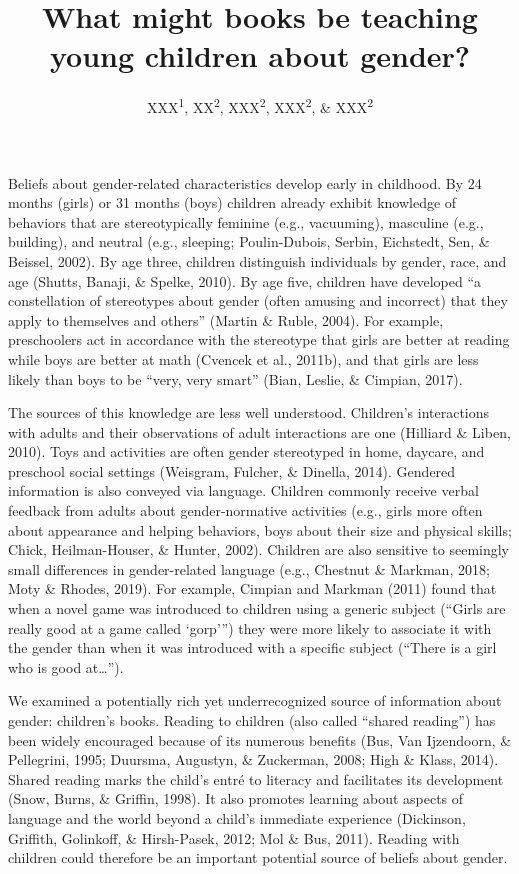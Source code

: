 \documentclass[
  english,
  ,man,floatsintext]{apa6}
\title{What might books be teaching young children about gender?}
\author{XXX\textsuperscript{1}, XX\textsuperscript{2}, XXX\textsuperscript{2}, XXX\textsuperscript{2}, \& XXX\textsuperscript{2}}
\date{}
\affiliation{\vspace{0.5cm}\textsuperscript{1} XXX\\\textsuperscript{2} XXX}
\begin{document}
\maketitle

Beliefs about gender-related characteristics develop early in childhood. By 24 months (girls) or 31 months (boys) children already exhibit knowledge of behaviors that are stereotypically feminine (e.g., vacuuming), masculine (e.g., building), and neutral (e.g., sleeping; Poulin-Dubois, Serbin, Eichstedt, Sen, \& Beissel, 2002). By age three, children distinguish individuals by gender, race, and age (Shutts, Banaji, \& Spelke, 2010). By age five, children have developed \enquote{a constellation of stereotypes about gender (often amusing and incorrect) that they apply to themselves and others} (Martin \& Ruble, 2004). For example, preschoolers act in accordance with the stereotype that girls are better at reading while boys are better at math (Cvencek et al., 2011b), and that girls are less likely than boys to be \enquote{very, very smart} (Bian, Leslie, \& Cimpian, 2017).

The sources of this knowledge are less well understood. Children's interactions with adults and their observations of adult interactions are one (Hilliard \& Liben, 2010). Toys and activities are often gender stereotyped in home, daycare, and preschool social settings (Weisgram, Fulcher, \& Dinella, 2014). Gendered information is also conveyed via language. Children commonly receive verbal feedback from adults about gender-normative activities (e.g., girls more often about appearance and helping behaviors, boys about their size and physical skills; Chick, Heilman-Houser, \& Hunter, 2002). Children are also sensitive to seemingly small differences in gender-related language (e.g., Chestnut \& Markman, 2018; Moty \& Rhodes, 2019). For example, Cimpian and Markman (2011) found that when a novel game was introduced to children using a generic subject (\enquote{Girls are really good at a game called \enquote{gorp}}) they were more likely to associate it with the gender than when it was introduced with a specific subject (\enquote{There is a girl who is good at\ldots{}}).

We examined a potentially rich yet underrecognized source of information about gender: children's books. Reading to children (also called \enquote{shared reading}) has been widely encouraged because of its numerous benefits (Bus, Van Ijzendoorn, \& Pellegrini, 1995; Duursma, Augustyn, \& Zuckerman, 2008; High \& Klass, 2014). Shared reading marks the child's entré to literacy and facilitates its development (Snow, Burns, \& Griffin, 1998). It also promotes learning about aspects of language and the world beyond a child's immediate experience (Dickinson, Griffith, Golinkoff, \& Hirsh-Pasek, 2012; Mol \& Bus, 2011). Reading with children could therefore be an important potential source of beliefs about gender.
\end{document}
